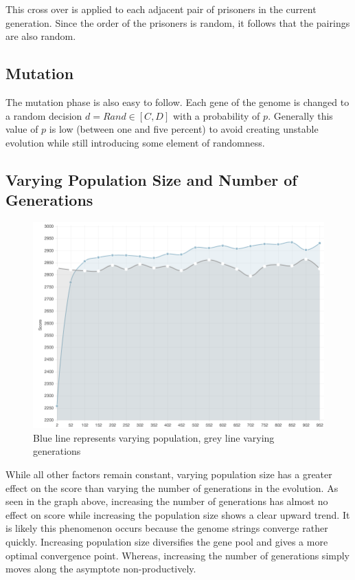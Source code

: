\documentclass[12pt]{article}
\begin{document}
This cross over is applied to each adjacent pair of prisoners in the current
generation.  Since the order of the prisoners is random, it follows that the pairings
are also random.

\subsection{Mutation}
\label{mutation}

The mutation phase is also easy to follow.  Each gene of the genome is changed
to a random decision $d = Rand \in [C, D]$ with a probability of $p$.  Generally
this value of $p$ is low (between one and five percent) to avoid creating unstable
evolution while still introducing some element of randomness.

\pagebreak

\subsection{Varying Population Size and Number of Generations}
\label{vpg}
\begin{figure}[h!]
    \centering
    \includegraphics[scale=0.5]{figures/gen_pop_compare}
    \caption{Blue line represents varying population, grey line varying generations}
\end{figure}

While all other factors remain constant,
varying population size has a greater effect on the score than varying the number
of generations in the evolution. As seen in the graph above, increasing the number
of generations has almost no effect on score while increasing the population
size shows a clear upward trend.  It is likely this phenomenon occurs because the genome
strings converge rather quickly.  Increasing population size diversifies
the gene pool and gives a more optimal convergence point. Whereas, increasing
the number of generations simply moves along the asymptote non-productively.
\end{document}
